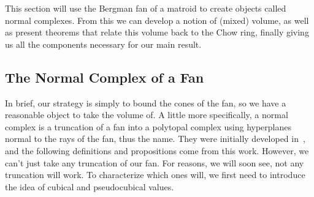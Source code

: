 \documentclass[12pt,oneside]{../../sfsuthesis}
\begin{document}
This section will use the Bergman fan of a matroid to create objects called  normal complexes.
From this we can develop a notion of (mixed) volume, as well as present theorems that relate this volume back to the Chow ring, finally giving us all the components necessary for our main result.

\subsection{The Normal Complex of a Fan}
In brief, our strategy is simply to bound the cones of the fan, so we have a reasonable object to take the volume of.
A little more specifically, a normal complex is a truncation of a fan into a polytopal complex using hyperplanes normal to the rays of the fan, thus the name.
They were initially developed in~\cite{nathansonTropicalFansNormal2023}, and the following definitions and propositions come from this work.
However, we can't just take any truncation of our fan.
For reasons, we will soon see, not any truncation will work.
To characterize which ones will, we first need to introduce the idea of cubical and pseudocubical values.
\end{document}
